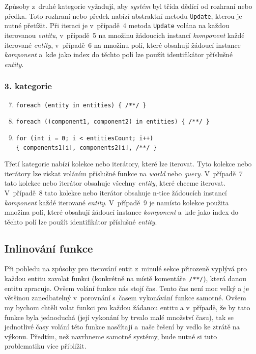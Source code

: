 Způsoby z~druhé kategorie vyžadují, aby \textit{systém} byl třída dědící od rozhraní nebo předka. Toto rozhraní nebo předek nabízí abstraktní metodu \verb|Update|, kterou je nutné přetížit. Při iteraci je v~případě~4 metoda \verb|Update| volána na každou iterovanou \textit{entitu}, v~případě~5 na množinu žádoucích instancí \textit{komponent} každé iterované \textit{entity}, v~případě~6 na množinu polí, které obsahují žádoucí instance \textit{komponent} a~kde jako index do těchto polí lze použít identifikátor příslušné \textit{entity}.

\subsubsection{3. kategorie}

\begin{enumerate}
    \setcounter{enumi}{6}
    \item \verb|foreach (entity in entities) { /**/ }|
    \item \verb|foreach ((component1, component2) in entities) { /**/ }|
    \item \verb|for (int i = 0; i < entitiesCount; i++)|\\\verb|{ components1[i], components2[i], /**/ }|
\end{enumerate}

Třetí kategorie nabízí kolekce nebo iterátory, které lze iterovat. Tyto kolekce nebo iterátory lze získat voláním příslušné funkce na \textit{world} nebo \textit{query}. V~případě~7 tato kolekce nebo iterátor obsahuje všechny \textit{entity}, které chceme iterovat. V~případě~8 tato kolekce nebo iterátor obsahuje n-tice žádoucích instancí \textit{komponent} každé iterované \textit{entity}. V~případě~9 je namísto kolekce použita množina polí, které obsahují žádoucí instance \textit{komponent} a~kde jako index do těchto polí lze použít identifikátor příslušné \textit{entity}.

\subsection{Inlinování funkce}
Při pohledu na způsoby pro iterování entit z~minulé sekce přirozeně vyplývá pro každou entitu zavolat funkci (konkrétně na místě komentáře~\verb|/**/|), která danou entitu zpracuje. Ovšem volání funkce nás stojí čas. Tento čas není moc velký a je většinou zanedbatelný v~porovnání s~časem vykonávání funkce samotné. Ovšem my bychom chtěli volat funkci pro každou žádanou entitu a v~případě, že by tato funkce byla jednoduchá (její vykonání by trvalo malé množství času), tak se jednotlivé časy volání této funkce nasčítají a~naše řešení by vedlo ke ztrátě na výkonu. Předtím, než navrhneme samotné systémy, bude nutné si tuto problematiku více přiblížit.

